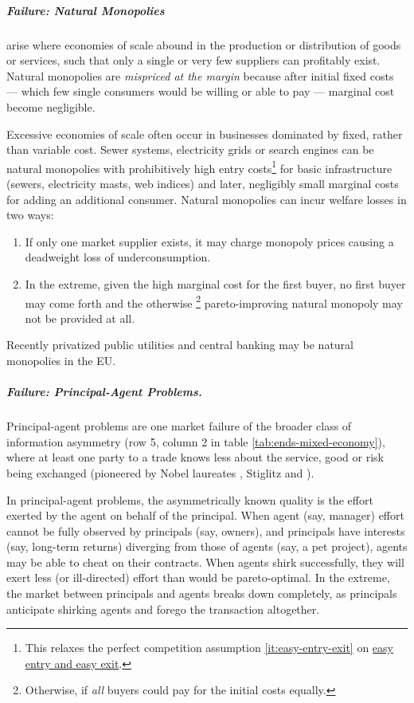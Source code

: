 \subparagraph{Failure: Natural Monopolies}  \label{sec:natural-monopoly} arise where economies of scale abound in the production or distribution of goods or services, such that only a single or very few suppliers can profitably exist. Natural monopolies are \emph{mispriced at the margin} because after initial fixed costs --- which few single consumers would be willing or able to pay --- marginal cost become negligible.

Excessive economies of scale often occur in businesses dominated by fixed, rather than variable cost. Sewer systems, electricity grids or search engines can be natural monopolies with prohibitively high entry costs\footnote{
	This relaxes the perfect competition assumption \ref{it:easy-entry-exit} on \hyperref[it:easy-entry-exit]{easy entry and easy exit}.} 
for basic infrastructure (sewers, electricity masts, web indices) and later, negligibly small marginal costs for adding an additional consumer.  Natural monopolies can incur welfare losses in two ways: 
\begin{enumerate}
	\item If only one market supplier exists, it may charge monopoly prices causing a deadweight loss of underconsumption. 
	\item In the extreme, given the high marginal cost for the first buyer, no first buyer may come forth and the otherwise
\footnote{
	Otherwise, if \emph{all} buyers could pay for the initial costs equally.
} pareto-improving natural monopoly may not be provided at all.
\end{enumerate} 
Recently privatized public utilities and central banking may be natural monopolies in the \gls{EU}.

\subparagraph[Failure: Principal-Agent Problems]{Failure: Principal-Agent Problems.} \label{sec:principal-agent-problem} 
Principal-agent problems are one market failure of the broader class of information asymmetry (row 5, column 2 in table \ref{tab:ends-mixed-economy}), where at least one party to a trade knows less about the service, good or risk being exchanged (pioneered by Nobel laureates \citealt{Akerlof-1970-aa}, Stiglitz \citeyear{Stiglitz1976} and \citealt{Spence1974}).

In principal-agent problems, the asymmetrically known quality is the effort exerted by the agent on behalf of the principal. When agent (say, manager) effort cannot be fully observed by principals (say, owners), and principals have interests (say, long-term returns) diverging from those of agents (say, a pet project), agents may be able to cheat on their contracts. When agents shirk successfully, they will exert less (or ill-directed) effort than would be pareto-optimal. In the extreme, the market between principals and agents breaks down completely, as principals anticipate shirking agents and forego the transaction altogether. 

